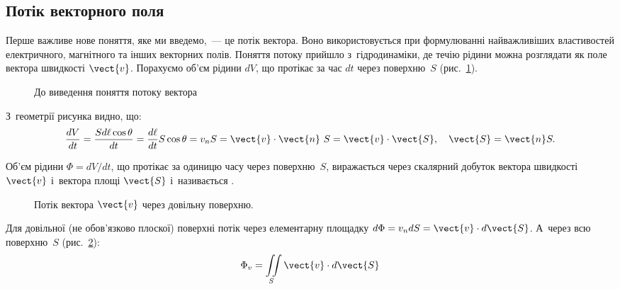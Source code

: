 \subsection*{Потік векторного поля}



Перше важливе нове поняття, яке ми введемо,~--- це потік вектора. Воно використовується при формулюванні найважливіших властивостей електричного,
магнітного та інших векторних полів. Поняття потоку прийшло з~гідродинаміки, де течію
рідини можна розглядати як поле вектора швидкості $\vect{v}$. Порахуємо об'єм рідини $dV$,
що протікає за час $dt$ через поверхню~$S$ (рис.~\ref{tikz:Flux}).

\begin{figure}[h!]\centering
	\caption{До виведення поняття потоку вектора}
	\label{tikz:Flux}
\end{figure}

З~геометрії рисунка видно, що:
\begin{equation*}
	\frac{dV}{dt} = \frac{S d\ell \cos\theta}{dt} = 
	\frac{d\ell}{dt} S\cos\theta = 
	v_n S = \vect{v} \cdot \vect{n}\ S = 
	\vect{v} \cdot \vect{S},
	\quad
	\vect{S}
	= \vect{n}S.
\end{equation*}

Об'єм рідини $\Phi = dV/dt$, що протікає за одиницю часу через поверхню~$S$, виражається
через скалярний добуток вектора швидкості $\vect{v}$ і~вектора площі $\vect{S}$
і~називається .

\begin{figure}
	\caption{Потік вектора $\vect{v}$ через довільну поверхню.}
	\label{tikz:v_flux}
\end{figure}

Для довільної (не обов'язково плоскої) поверхні потік через елементарну площадку $d\Phi =
	v_n dS = \vect{v}\cdot d\vect{S}$. А~через всю поверхню~$S$ (рис.~\ref{tikz:v_flux}):
\begin{equation*}
	\Phi_v = \iint\limits_S \vect{v}\cdot d\vect{S}
\end{equation*}

